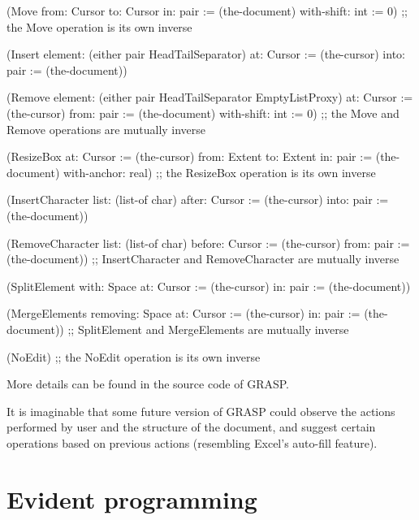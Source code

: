 \documentclass[sigconf]{acmart}
\newenvironment{Snippet}{\Verbatim[samepage=true]}{\endVerbatim}
\begin{document}
\begin{Snippet}
(Move from: Cursor
      to: Cursor
      in: pair := (the-document)
      with-shift: int := 0)
;; the Move operation is its own inverse

\end{Snippet}
\begin{Snippet}
(Insert element: (either pair HeadTailSeparator)
	at: Cursor := (the-cursor)
	into: pair := (the-document))

(Remove element: (either pair
			 HeadTailSeparator
			 EmptyListProxy)
	at: Cursor := (the-cursor)
	from: pair := (the-document)
	with-shift: int := 0)
;; the Move and Remove operations are mutually inverse

\end{Snippet}
\begin{Snippet}
(ResizeBox at: Cursor := (the-cursor)
	   from: Extent
	   to: Extent
	   in: pair := (the-document)
	   with-anchor: real)
;; the ResizeBox operation is its own inverse

\end{Snippet}
\begin{Snippet}
(InsertCharacter list: (list-of char)
		 after: Cursor := (the-cursor)
		 into: pair := (the-document))

(RemoveCharacter list: (list-of char)
		 before: Cursor := (the-cursor)
		 from: pair := (the-document))
;; InsertCharacter and RemoveCharacter are mutually inverse

\end{Snippet}
\begin{Snippet}
(SplitElement with: Space
	      at: Cursor := (the-cursor)
	      in: pair := (the-document))

(MergeElements removing: Space
	       at: Cursor := (the-cursor)
	       in: pair := (the-document))
;; SplitElement and MergeElements are mutually inverse

\end{Snippet}
\begin{Snippet}
(NoEdit)
;; the NoEdit operation is its own inverse
\end{Snippet}

More details can be found in the source code
of GRASP.

It is imaginable that some future version
of GRASP could observe the actions performed
by user and the structure of the document,
and suggest certain operations based on
previous actions (resembling Excel's auto-fill
feature).

\section{Evident programming}
\end{document}
